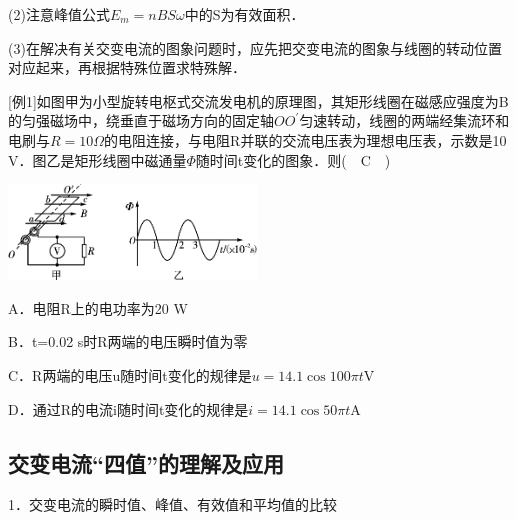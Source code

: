 \documentclass[cn,10.5pt,chinese,mac,chinesefont=founder]{elegantbook}
\begin{document}
(2)注意峰值公式$E_m=nBS\omega$中的S为有效面积．

(3)在解决有关交变电流的图象问题时，应先把交变电流的图象与线圈的转动位置对应起来，再根据特殊位置求特殊解．

{[}例1{]}如图甲为小型旋转电枢式交流发电机的原理图，其矩形线圈在磁感应强度为B的匀强磁场中，绕垂直于磁场方向的固定轴$OO^\prime$匀速转动，线圈的两端经集流环和电刷与$R=10\Omega$的电阻连接，与电阻R并联的交流电压表为理想电压表，示数是10
V．图乙是矩形线圈中磁通量$\Phi$随时间t变化的图象．则(　C　)

\begin{center}\includegraphics[width=2.59444in,height=1in]{media/image443.png}\end{center}

A．电阻R上的电功率为20 W

B．t=0.02 s时R两端的电压瞬时值为零

C．R两端的电压u随时间t变化的规律是$u=14.1\cos 100\pi t $V

D．通过R的电流i随时间t变化的规律是$i=14.1\cos 50\pi t $A

\subsection{交变电流``四值''的理解及应用}

1．交变电流的瞬时值、峰值、有效值和平均值的比较
\end{document}
